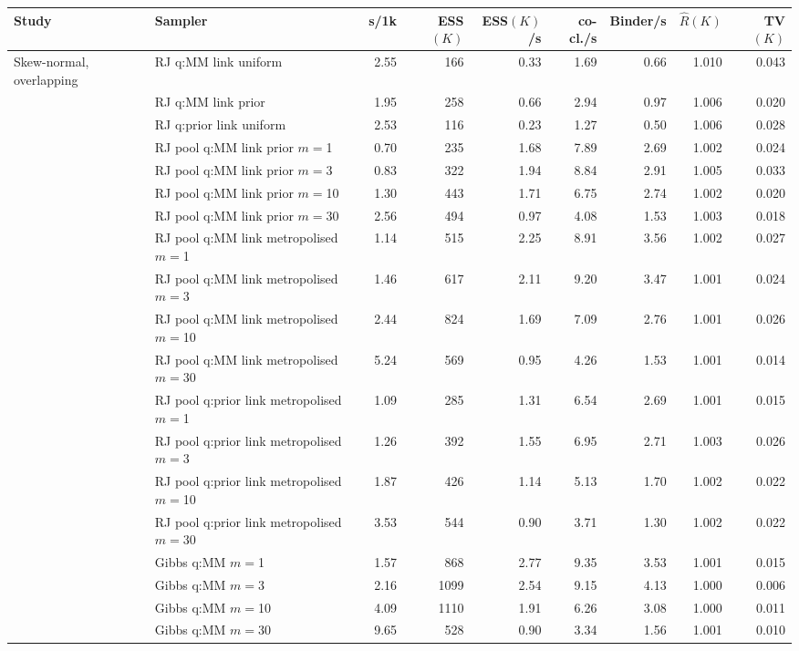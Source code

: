 \begin{tabular}{ll rrrrrrr}
\toprule
Study & Sampler & s/1k & ESS$(K)$ & ESS$(K)$/s & co-cl./s & Binder/s & $\hat R(K)$ & TV$(K)$ \\
\midrule
Skew-normal, overlapping & RJ q:MM link uniform & 2.55 & 166 & 0.33 & 1.69 & 0.66 & 1.010 & 0.043 \\
 & RJ q:MM link prior & 1.95 & 258 & 0.66 & 2.94 & 0.97 & 1.006 & 0.020 \\
 & RJ q:prior link uniform & 2.53 & 116 & 0.23 & 1.27 & 0.50 & 1.006 & 0.028 \\
 & RJ pool q:MM link prior $m=$1 & 0.70 & 235 & 1.68 & 7.89 & 2.69 & 1.002 & 0.024 \\
 & RJ pool q:MM link prior $m=$3 & 0.83 & 322 & 1.94 & 8.84 & 2.91 & 1.005 & 0.033 \\
 & RJ pool q:MM link prior $m=$10 & 1.30 & 443 & 1.71 & 6.75 & 2.74 & 1.002 & 0.020 \\
 & RJ pool q:MM link prior $m=$30 & 2.56 & 494 & 0.97 & 4.08 & 1.53 & 1.003 & 0.018 \\
 & RJ pool q:MM link metropolised $m=$1 & 1.14 & 515 & 2.25 & 8.91 & 3.56 & 1.002 & 0.027 \\
 & RJ pool q:MM link metropolised $m=$3 & 1.46 & 617 & 2.11 & 9.20 & 3.47 & 1.001 & 0.024 \\
 & RJ pool q:MM link metropolised $m=$10 & 2.44 & 824 & 1.69 & 7.09 & 2.76 & 1.001 & 0.026 \\
 & RJ pool q:MM link metropolised $m=$30 & 5.24 & 569 & 0.95 & 4.26 & 1.53 & 1.001 & 0.014 \\
 & RJ pool q:prior link metropolised $m=$1 & 1.09 & 285 & 1.31 & 6.54 & 2.69 & 1.001 & 0.015 \\
 & RJ pool q:prior link metropolised $m=$3 & 1.26 & 392 & 1.55 & 6.95 & 2.71 & 1.003 & 0.026 \\
 & RJ pool q:prior link metropolised $m=$10 & 1.87 & 426 & 1.14 & 5.13 & 1.70 & 1.002 & 0.022 \\
 & RJ pool q:prior link metropolised $m=$30 & 3.53 & 544 & 0.90 & 3.71 & 1.30 & 1.002 & 0.022 \\
 & Gibbs q:MM $m=$1 & 1.57 & 868 & 2.77 & 9.35 & 3.53 & 1.001 & 0.015 \\
 & Gibbs q:MM $m=$3 & 2.16 & 1099 & 2.54 & 9.15 & 4.13 & 1.000 & 0.006 \\
 & Gibbs q:MM $m=$10 & 4.09 & 1110 & 1.91 & 6.26 & 3.08 & 1.000 & 0.011 \\
 & Gibbs q:MM $m=$30 & 9.65 & 528 & 0.90 & 3.34 & 1.56 & 1.001 & 0.010 \\

\end{tabular}
